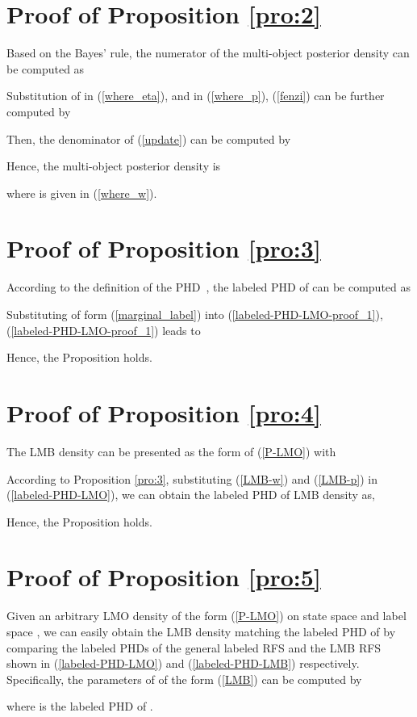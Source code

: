 \documentclass[journal]{IEEEtran}
\begin{document}
{\section{Proof of Proposition \ref{pro:2}}
Based on the Bayes' rule, the numerator of the multi-object posterior  density  can be computed as 

Substitution of    in (\ref{where_eta}), and    in (\ref{where_p}), (\ref{fenzi}) can be further computed by

Then, the denominator of    (\ref{update}) can be computed by

Hence, the multi-object posterior density  is

where  is given in (\ref{where_w}).
\section{Proof of Proposition \ref{pro:3}}
According to the definition of the PHD~\cite{refr:Mahler_book}, the labeled PHD of  can be computed as

 Substituting  of form (\ref{marginal_label})  into (\ref{labeled-PHD-LMO-proof_1}), (\ref{labeled-PHD-LMO-proof_1}) leads to 

Hence, the Proposition holds.
\section{Proof of Proposition \ref{pro:4}}
The LMB density can  be presented as the form of (\ref{P-LMO}) with
\begin{small}

\end{small}
According to Proposition \ref{pro:3}, substituting (\ref{LMB-w}) and (\ref{LMB-p})  in (\ref{labeled-PHD-LMO}), we can obtain the labeled PHD of LMB density  as,

Hence, the Proposition holds.


\section{Proof of Proposition \ref{pro:5}}
Given an arbitrary LMO density  of the form (\ref{P-LMO}) on state space  and label space , we can easily obtain  the  LMB density   
matching the   labeled PHD  of  by comparing  the labeled PHDs  of the general labeled RFS and the LMB RFS shown in (\ref{labeled-PHD-LMO}) and (\ref{labeled-PHD-LMB}) respectively.
Specifically, the parameters of   of the form (\ref{LMB})
can be computed by

where  is the labeled PHD of .

}
\end{document}
